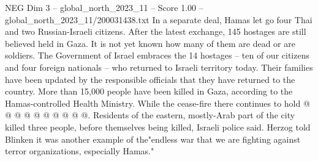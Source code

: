 \begin{textsample}{NEG Dim 3 – global\_north\_2023\_11 – Score 1.00 – global\_north\_2023\_11/200031438.txt}
In a separate deal, Hamas let go four Thai and two Russian-Israeli citizens.
After the latest exchange, 145 hostages are still believed held in Gaza.
It is not yet known how many of them are dead or are soldiers.
The Government of Israel embraces the 14 hostages -- ten of our citizens and four foreign nationals -- who returned to Israeli territory today.
Their families have been updated by the responsible officials that they have returned to the country.
More than 15,000 people have been killed in Gaza, according to the Hamas-controlled Health Ministry.
While the cease-fire there continues to hold @ @ @ @ @ @ @ @ @ @.
Residents of the eastern, mostly-Arab part of the city killed three people, before themselves being killed, Israeli police said.
Herzog told Blinken it was another example of the"endless war that we are fighting against terror organizations, especially Hamas."

\end{textsample}
